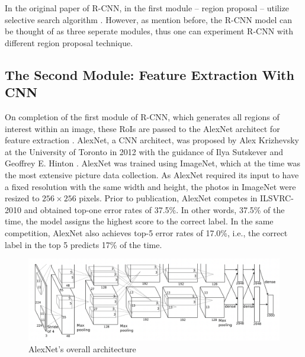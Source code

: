 In the original paper of R-CNN, in the first module -- region proposal -- utilize selective search algorithm \cite{Girshick_R_CNN_2013}. However, as mention before, the R-CNN model can be thought of as three seperate modules, thus one can experiment R-CNN with different region proposal technique.

\subsection{The Second Module: Feature Extraction With CNN}
On completion of the first module of R-CNN, which generates all regions of interest within an image, these RoIs are passed to the AlexNet architect for feature extraction \cite{Girshick_R_CNN_2013}. AlexNet, a CNN architect, was proposed by Alex Krizhevsky at the University of Toronto in 2012 with the guidance of Ilya Sutskever and Geoffrey E. Hinton \cite{AlexNet_2017}. AlexNet was trained using ImageNet, which at the time was the most extensive picture data collection. As AlexNet required its input to have a fixed resolution with the same width and height, the photos in ImageNet were resized to $256 \times 256$ pixels. Prior to publication, AlexNet competes in ILSVRC-2010 and obtained top-one error rates of 37.5\%. In other words, 37.5\% of the time, the model assigns the highest score to the correct label.  In the same competition, AlexNet also achieves top-5 error rates of 17.0\%, i.e., the correct label in the top 5 predicts 17\% of the time.

\begin{figure}[!ht]
    \centering
    \includegraphics[width=6in]{figures/alex_net.png}
    \caption{AlexNet's overall architecture \cite{AlexNet_2017}} \label{fig:alex_net_architecture}
\end{figure}

